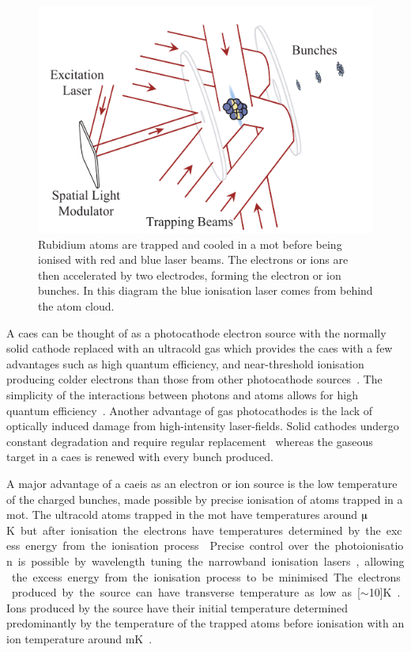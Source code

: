 \begin{figure}
    \center
    \includegraphics{0intro/Figs/simple_caeis_schem.pdf}
    \caption[Simplified cold atom ion and electron source schematic.]{Rubidium atoms are trapped and cooled in a \gls{mot} before being ionised with red and blue laser beams. The electrons or ions are then accelerated by two electrodes, forming the electron or ion bunches. In this diagram the blue ionisation laser comes from behind the atom cloud.}
    \label{figure:simple_caeis_schem}
\end{figure}

A \gls{caes} can be thought of as a photocathode electron source with the normally solid cathode replaced with an ultracold gas which provides the \gls{caes} with a few advantages such as high quantum efficiency, and near-threshold ionisation producing colder electrons than those from other photocathode sources~\cite{engelen_effective_2014}.
The simplicity of the interactions between photons and atoms allows for high quantum efficiency~\cite{baranov_field_1994}.
Another advantage of gas photocathodes is the lack of optically induced damage from high-intensity laser-fields.
Solid cathodes undergo constant degradation and require regular replacement~\cite{dowell_results_1995} whereas the gaseous target in a \gls{caes} is renewed with every bunch produced.

A major advantage of a \gls{caeis} as an electron or ion source is the low temperature of the charged bunches, made possible by precise ionisation of atoms trapped in a \gls{mot}.
The ultracold atoms trapped in the \gls{mot} have temperatures around \unit[100]{$\muup$K} but after ionisation the electrons have temperatures determined by the excess energy from the ionisation process~\cite{engelen_high-coherence_2013,engelen_analytical_2014,sparkes_high-coherence_2014,speirs_identification_2017}.
Precise control over the photoionisation is possible by wavelength tuning the narrowband ionisation lasers, allowing the excess energy from the ionisation process to be minimised.
The electrons produced by the source can have transverse temperature as low as \unit[$\sim$10]{K}~\cite{saliba_spatial_2012}.
Ions produced by the source have their initial temperature determined predominantly by the temperature of the trapped atoms before ionisation with an ion temperature around \unit[1]{mK}~\cite{debernardi_measurement_2011,murphy_detailed_2014}.

